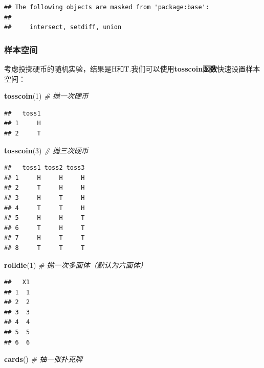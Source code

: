 \documentclass[]{article}
\newenvironment{Shaded}{\begin{snugshade}}{\end{snugshade}}
\newcommand{\KeywordTok}[1]{\textcolor[rgb]{0.13,0.29,0.53}{\textbf{{#1}}}}
\newcommand{\DecValTok}[1]{\textcolor[rgb]{0.00,0.00,0.81}{{#1}}}
\newcommand{\CommentTok}[1]{\textcolor[rgb]{0.56,0.35,0.01}{\textit{{#1}}}}
\newcommand{\NormalTok}[1]{{#1}}
\begin{document}
\begin{verbatim}
## The following objects are masked from 'package:base':
## 
##     intersect, setdiff, union
\end{verbatim}

\subsubsection{样本空间}

考虑投掷硬币的随机实验，结果是H和T.我们可以使用\textbf{tosscoin函数}快速设置样本空间：

\begin{Shaded}
\begin{Highlighting}[]
\KeywordTok{tosscoin}\NormalTok{(}\DecValTok{1}\NormalTok{) }\CommentTok{# 抛一次硬币}
\end{Highlighting}
\end{Shaded}

\begin{verbatim}
##   toss1
## 1     H
## 2     T
\end{verbatim}

\begin{Shaded}
\begin{Highlighting}[]
\KeywordTok{tosscoin}\NormalTok{(}\DecValTok{3}\NormalTok{) }\CommentTok{# 抛三次硬币}
\end{Highlighting}
\end{Shaded}

\begin{verbatim}
##   toss1 toss2 toss3
## 1     H     H     H
## 2     T     H     H
## 3     H     T     H
## 4     T     T     H
## 5     H     H     T
## 6     T     H     T
## 7     H     T     T
## 8     T     T     T
\end{verbatim}

\begin{Shaded}
\begin{Highlighting}[]
\KeywordTok{rolldie}\NormalTok{(}\DecValTok{1}\NormalTok{) }\CommentTok{# 抛一次多面体（默认为六面体）}
\end{Highlighting}
\end{Shaded}

\begin{verbatim}
##   X1
## 1  1
## 2  2
## 3  3
## 4  4
## 5  5
## 6  6
\end{verbatim}

\begin{Shaded}
\begin{Highlighting}[]
\KeywordTok{cards}\NormalTok{() }\CommentTok{# 抽一张扑克牌}
\end{Highlighting}
\end{Shaded}
\end{document}

